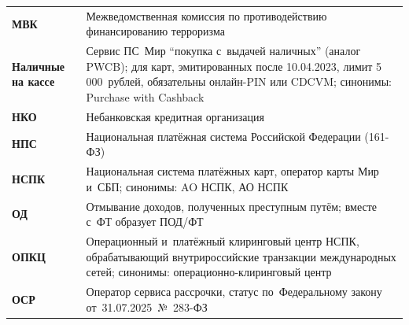 \begin{longtable}{@{}p{4.5em}p{\dimexpr\linewidth-4.5em-2\tabcolsep\relax}@{}}
  \textbf{МВК}               & Межведомственная комиссия по противодействию финансированию терроризма                                                                                                                                                                                                                           \\
  \textbf{Наличные на кассе} & Сервис ПС~Мир \enquote{покупка с~выдачей наличных} (аналог PWCB); для карт, эмитированных после 10.04.2023, лимит 5\,000~рублей, обязательны онлайн-PIN или CDCVM; синонимы: Purchase with Cashback                                                                                              \\
  \textbf{НКО}               & Небанковская кредитная организация                                                                                                                                                                                                                                                               \\
  \textbf{НПС}               & Национальная платёжная система Российской Федерации (161-ФЗ)                                                                                                                                                                                                                                     \\
  \textbf{НСПК}              & Национальная система платёжных карт, оператор карты Мир и~СБП; синонимы: AO НСПК, АО НСПК                                                                                                                                                                                                        \\
  \textbf{ОД}                & Отмывание доходов, полученных преступным путём; вместе с~ФТ образует ПОД/ФТ                                                                                                                                                                                                                      \\
  \textbf{ОПКЦ}              & Операционный и~платёжный клиринговый центр НСПК, обрабатывающий внутрироссийские транзакции международных сетей; синонимы: операционно-клиринговый центр                                                                                                                                          \\
  \textbf{ОСР}               & Оператор сервиса рассрочки, статус по~Федеральному закону от~31.07.2025~№~283-ФЗ                                                                                                                                                                                                                                           \\

\end{longtable}
